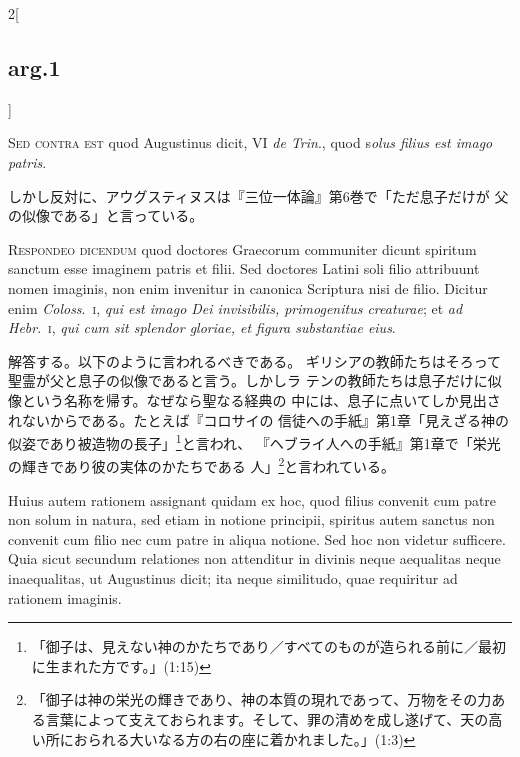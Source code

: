 \documentclass[paper=a4paper,fontsize=10pt,jafontsize=9pt,titlepage]{jlreq}
\begin{document}
\begin{paracol}{2}[\subsection{arg.1}]
\switchcolumn*[\subsection{s.c.}]

{\scshape Sed contra est} quod Augustinus dicit, VI {\itshape de Trin}., quod s{\itshape olus filius
est imago patris}.

\switchcolumn

しかし反対に、アウグスティヌスは『三位一体論』第6巻で「ただ息子だけが
 父の似像である」と言っている。


{\scshape Respondeo dicendum} quod doctores Graecorum communiter dicunt spiritum
sanctum esse imaginem patris et filii. Sed doctores Latini soli filio
attribuunt nomen imaginis, non enim invenitur in canonica Scriptura
nisi de filio. Dicitur enim {\itshape Coloss}.~{\scshape i}, {\itshape qui est imago Dei invisibilis,
primogenitus creaturae}; et {\itshape ad Hebr}.~{\scshape i}, {\itshape qui cum sit splendor gloriae,
et figura substantiae eius}.

\switchcolumn

解答する。以下のように言われるべきである。
ギリシアの教師たちはそろって聖霊が父と息子の似像であると言う。しかしラ
 テンの教師たちは息子だけに似像という名称を帰す。なぜなら聖なる経典の
 中には、息子に点いてしか見出されないからである。たとえば『コロサイの
 信徒への手紙』第1章「見えざる神の似姿であり被造物の長子」\footnote{「御子は、見えない神のかたちであり／すべてのものが造られる前に／最初に生まれた方です。」(1:15)}と言われ、
 『ヘブライ人への手紙』第1章で「栄光の輝きであり彼の実体のかたちである
 人」\footnote{「御子は神の栄光の輝きであり、神の本質の現れであって、万物をその力ある言葉によって支えておられます。そして、罪の清めを成し遂げて、天の高い所におられる大いなる方の右の座に着かれました。」(1:3)}と言われている。

\switchcolumn*

Huius autem rationem assignant quidam ex
hoc, quod filius convenit cum patre non solum in natura, sed etiam in
notione principii, spiritus autem sanctus non convenit cum filio nec
cum patre in aliqua notione. Sed hoc non videtur sufficere. Quia sicut
secundum relationes non attenditur in divinis neque aequalitas neque
inaequalitas, ut Augustinus dicit; ita neque similitudo, quae
requiritur ad rationem imaginis.


\end{paracol}
\end{document}
